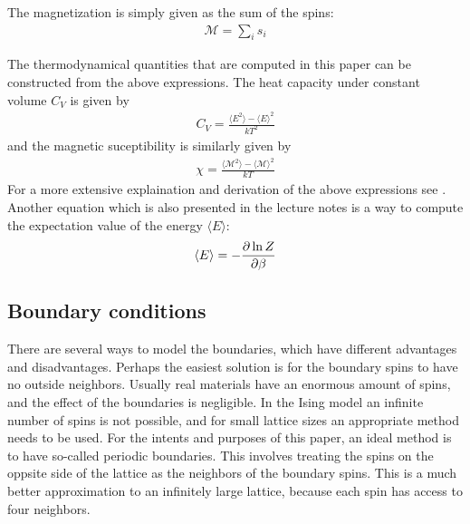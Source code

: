 \documentclass[aps,reprint]{revtex4-1}
\newcommand{\mean}[1]{\langle #1 \rangle}
\begin{document}
The magnetization is simply given as the sum of the spins:
\begin{align}\label{eq:magmom}
  \mathcal{M} = \sum_i s_i
\end{align}

The thermodynamical quantities that are computed in this paper can be constructed
from the above expressions. The heat capacity under constant volume $C_V$ is given
by
\begin{align}\label{eq:Cv}
  C_V = \frac{\mean{E^2} - \mean{E}^2}{kT^2}
\end{align}
and the magnetic suceptibility is similarly given by
\begin{align}\label{eq:sus}
  \chi = \frac{\mean{\mathcal{M}^2} - \mean{\mathcal{M}}^2}{kT}
\end{align}
For a more extensive explaination and derivation of the above expressions see
\cite{mortenjensen}. Another equation which is also presented in the lecture notes
is a way to compute the expectation value of the energy $\mean{E}$:
\begin{align}\label{eq:meanE}
  \mean{E} = - \pdv{\ln{Z}}{\beta}
\end{align}

\subsection{Boundary conditions}
There are several ways to model the boundaries, which have different advantages
and disadvantages. Perhaps the easiest solution is for the boundary spins to have
no outside neighbors. Usually real materials have an enormous amount of spins,
and the effect of the boundaries is negligible. In the Ising model an infinite
number of spins is not possible, and for small lattice sizes an appropriate
method needs to be used. For the intents and purposes of this paper, an ideal
method is to have so-called periodic boundaries. This involves treating the
spins on the oppsite side of the lattice as the neighbors of the boundary spins.
This is a much better approximation to an infinitely large lattice, because
each spin has access to four neighbors.
\end{document}
